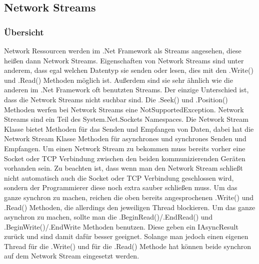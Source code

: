 \subsection{Network Streams} \label{ns}
\subsubsection{Übersicht}
Network Ressourcen werden im .Net Framework als Streams angesehen, diese heißen dann Network Streams. Eigenschaften von Network Streams sind unter anderem, dass egal welchen Datentyp sie senden oder lesen, dies mit den .Write() und .Read() Methoden möglich ist. Außerdem sind sie sehr ähnlich wie die anderen im .Net Framework oft benutzten Streams. Der einzige Unterschied ist, dass die Network Streams nicht suchbar sind. Die .Seek() und .Position() Methoden werfen bei Network Streams eine NotSupportedException. Network Streams sind ein Teil des System.Net.Sockets Namespaces. Die Network Stream Klasse bietet Methoden für das Senden und Empfangen von Daten, dabei hat die Network Stream Klasse Methoden für asynchrones und synchrones Senden und Empfangen. Um einen Network Stream zu bekommen muss bereits vorher eine Socket oder TCP Verbindung zwischen den beiden kommunizierenden Geräten vorhanden sein. Zu beachten ist, dass wenn man den Network Stream schließt nicht automatisch auch die Socket oder TCP Verbindung geschlossen wird, sondern der Programmierer diese noch extra sauber schließen muss. Um das ganze synchron zu machen, reichen die oben bereits angesprochenen .Write() und .Read() Methoden, die allerdings den jeweiligen Thread blockieren. Um das ganze asynchron zu machen, sollte man die .BeginRead()/.EndRead() und .BeginWrite()/.EndWrite Methoden benutzen. Diese geben ein IAsyncResult zurück und sind damit dafür besser geeignet. Solange man jedoch einen eigenen Thread für die .Write() und für die .Read() Methode hat können beide synchron auf dem Network Stream eingesetzt werden.
